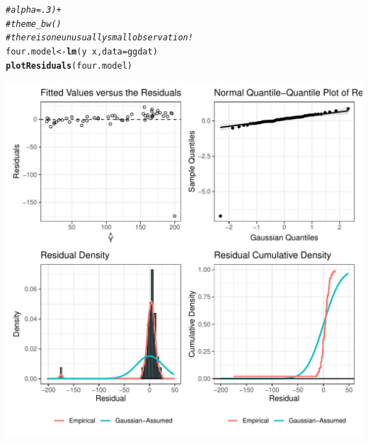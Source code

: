 \documentclass{article}\usepackage[]{graphicx}\usepackage[]{color}
\makeatletter
\def\maxwidth{ %
  \ifdim\Gin@nat@width>\linewidth
    \linewidth
  \else
    \Gin@nat@width
  \fi
}
\newcommand{\hlcom}[1]{\textcolor[rgb]{0.678,0.584,0.686}{\textit{#1}}}%
\newcommand{\hlopt}[1]{\textcolor[rgb]{0,0,0}{#1}}%
\newcommand{\hlstd}[1]{\textcolor[rgb]{0.345,0.345,0.345}{#1}}%
\newcommand{\hlkwb}[1]{\textcolor[rgb]{0.69,0.353,0.396}{#1}}%
\newcommand{\hlkwc}[1]{\textcolor[rgb]{0.333,0.667,0.333}{#1}}%
\newcommand{\hlkwd}[1]{\textcolor[rgb]{0.737,0.353,0.396}{\textbf{#1}}}%
\newenvironment{kframe}{%
 \def\at@end@of@kframe{}%
 \ifinner\ifhmode%
  \def\at@end@of@kframe{\end{minipage}}%
  \begin{minipage}{\columnwidth}%
 \fi\fi%
 \def\FrameCommand##1{\hskip\@totalleftmargin \hskip-\fboxsep
 \colorbox{shadecolor}{##1}\hskip-\fboxsep
     \hskip-\linewidth \hskip-\@totalleftmargin \hskip\columnwidth}%
 \MakeFramed {\advance\hsize-\width
   \@totalleftmargin\z@ \linewidth\hsize
   \@setminipage}}%
 {\par\unskip\endMakeFramed%
 \at@end@of@kframe}
\newenvironment{knitrout}{}{} %
\makeatother
\begin{document}
\begin{enumerate}
\begin{enumerate}
\begin{enumerate}
\begin{knitrout}
\begin{kframe}
\begin{alltt}
\hlcom{#             alpha=.3)+}
\hlcom{#  theme_bw()}
\hlcom{#there is one unusually small observation!}
\hlstd{four.model}\hlkwb{<-}\hlkwd{lm}\hlstd{(y}\hlopt{~}\hlstd{x,} \hlkwc{data}\hlstd{=ggdat)}
\hlkwd{plotResiduals}\hlstd{(four.model)}
\end{alltt}
\end{kframe}
\includegraphics[width=\maxwidth]{figure/unnamed-chunk-28-1} 
\end{knitrout}


\end{enumerate}
\end{enumerate}
\end{enumerate}
\end{document}
